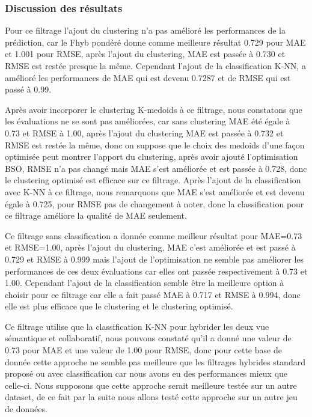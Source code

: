 \subsubsection*{Discussion des résultats}
 Pour ce filtrage l'ajout du clustering n'a pas amélioré les performances de la prédiction, car le Fhyb pondéré donne comme meilleure résultat 0.729 pour MAE et 1.001 pour RMSE, après l'ajout du clustering, MAE est passée à 0.730 et RMSE est restée presque la même.
Cependant l'ajout de la classification K-NN, a amélioré les performances de MAE qui est devenu 0.7287 et de RMSE qui est passé à 0.99.
 
 Après avoir incorporer le clustering K-medoids à ce filtrage, nous constatons que les évaluations ne se sont pas améliorées, car sans clustering MAE été égale à 0.73 et RMSE à 1.00, après l'ajout du clustering MAE est passée à 0.732 et RMSE est restée la même, donc on suppose que le choix des medoids d'une façon optimisée peut montrer l'apport du clustering, après avoir ajouté l'optimisation BSO, RMSE n'a pas changé mais MAE s'est améliorée et est passée à 0.728, donc le clustering optimisé est efficace sur ce filtrage.
Après l'ajout de la classification avec K-NN à ce filtrage, nous remarquons que MAE s'est améliorée et est devenu égale à 0.725, pour RMSE pas de changement à noter, donc la classification pour ce filtrage améliore la qualité de MAE seulement.

Ce filtrage sans classification a donnée comme meilleur résultat pour MAE=0.73 et RMSE=1.00, après l'ajout du clustering, MAE c'est améliorée et est passé à 0.729 et RMSE à 0.999 mais l'ajout de l'optimisation ne semble pas améliorer les performances de ces deux évaluations car elles ont passée respectivement à 0.73 et 1.00. Cependant l'ajout de la classification semble être la meilleure option à choisir pour ce filtrage car elle a fait passé MAE à 0.717 et RMSE à 0.994, donc elle est plus efficace que le clustering et le clustering optimisé.

Ce filtrage utilise que la classification K-NN pour hybrider les deux vue sémantique et collaboratif, nous pouvons constaté qu'il a donné une valeur de 0.73 pour MAE et une valeur de 1.00 pour RMSE, donc pour cette base de donnée cette approche ne semble pas meilleure que les filtrages hybrides standard proposé ou avec classification car nous avons eu des performances mieux que celle-ci. 
Nous supposons que cette approche serait meilleure testée sur un autre dataset, de ce fait par la suite nous allons testé cette approche sur un autre jeu de données.

